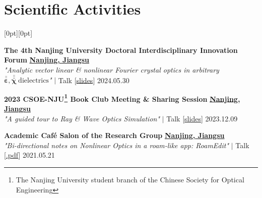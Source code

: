 
\section{Scientific Activities}
\raisebox{\baselineskip}[0pt][0pt]{}\label{Activities}
%
%
\begin{etaremune}[label={[\reversearabic*]},leftmargin=0.041\textwidth,itemsep=0pt]%
	{\item \textbf{The 4th Nanjing University Doctoral Interdisciplinary Innovation Forum} \hfill \href{https://www.google.com/maps/place/\%E4\%B8\%AD\%E5\%9B\%BD\%E6\%B1\%9F\%E8\%8B\%8F\%E7\%9C\%81\%E5\%8D\%97\%E4\%BA\%AC\%E5\%B8\%82}{\textbf{Nanjing, Jiangsu}} \\ \textit{ "Analytic vector linear \& nonlinear Fourier crystal optics in arbitrary $\bar{\bar{\boldsymbol \varepsilon}}, \bar{\bar{\bar{\boldsymbol \chi}}} \ \text{dielectrics}$"} $|$ {\color{color-detail} Talk} [\href{https://github.com/ChenZhu-Xie/PhD_academia/blob/master/2__Side_Projects/8.1__\%E5\%8D\%97\%E4\%BA\%AC\%E5\%A4\%A7\%E5\%AD\%A6\%E5\%8D\%9A\%E5\%A3\%AB\%E7\%94\%9F\%E5\%88\%9B\%E6\%96\%B0\%E8\%AE\%BA\%E5\%9D\%9B\%20talk\%20-\%20\%E4\%BB\%BB\%E6\%84\%8F\%20\%CE\%B5\%E2\%81\%BD\%C2\%B2\%E2\%81\%BE\%E3\%80\%81\%CF\%87\%E2\%81\%BD\%C2\%B3\%E2\%81\%BE\%20\%E7\%94\%B5\%E4\%BB\%8B\%E8\%B4\%A8\%20\%E4\%B8\%AD\%E7\%9A\%84\%20\%E8\%A7\%A3\%E6\%9E\%90\%E7\%9F\%A2\%E9\%87\%8F\%20\%E7\%BA\%BF\%E6\%80\%A7\%E3\%80\%81\%E9\%9D\%9E\%E7\%BA\%BF\%E6\%80\%A7\%20\%E5\%82\%85\%E7\%AB\%8B\%E5\%8F\%B6\%E5\%85\%89\%E5\%AD\%A6__4.0_year_-_2024.5.31.pdf}{\small slides}] \hfill 2024.05.30}
	{\item \textbf{2023 CSOE-NJU\footnote{The Nanjing University student branch of the Chinese Society for Optical Engineering} Book Club Meeting \& Sharing Session} \hfill \href{https://www.google.com/maps/place/\%E4\%B8\%AD\%E5\%9B\%BD\%E6\%B1\%9F\%E8\%8B\%8F\%E7\%9C\%81\%E5\%8D\%97\%E4\%BA\%AC\%E5\%B8\%82}{\textbf{Nanjing, Jiangsu}} \\ \textit{ "A guided tour to Ray \& Wave Optics Simulation"} $|$ {\color{color-detail} Talk} [\href{https://github.com/ChenZhu-Xie/PhD_academia/blob/master/2__Side_Projects/7.1__A_guided_tour_to_Ray_\%26_Wave_Optics_Simulation_\%E2\%86\%90_JavaScript\%2BPython__3.5_year_-_2023.12.9.pdf}{\small slides}] \hfill 2023.12.09}
	{\item \textbf{Academic Café Salon of the Research Group} \hfill \href{https://www.google.com/maps/place/\%E4\%B8\%AD\%E5\%9B\%BD\%E6\%B1\%9F\%E8\%8B\%8F\%E7\%9C\%81\%E5\%8D\%97\%E4\%BA\%AC\%E5\%B8\%82}{\textbf{Nanjing, Jiangsu}} \\ \textit{ "Bi-directional notes on Nonlinear Optics in a roam-like app: RoamEdit"} $|$ {\color{color-detail} Talk} [\href{https://github.com/ChenZhu-Xie/postgraduate_academia/blob/main/2__Side_Projects/2.1__Reading_Club\%EF\%BC\%9ANotes_with_Bi-directional_Links_in_RoamEdit__1.0_year_-_2021.5.21.pdf}{\small *.pdf}] \hfill 2021.05.21}
	{\item[] }
\end{etaremune}

